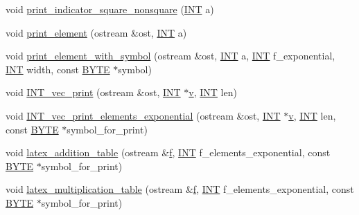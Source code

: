 \begin{DoxyCompactItemize}
\item 
void \mbox{\hyperlink{classfinite__field_a63e6335651a240d50fa79c5d1debbf21}{print\+\_\+indicator\+\_\+square\+\_\+nonsquare}} (\mbox{\hyperlink{galois_8h_a09fddde158a3a20bd2dcadb609de11dc}{I\+NT}} a)
\item 
void \mbox{\hyperlink{classfinite__field_ab7d1f59c043d7696b8b47c92d0fedad5}{print\+\_\+element}} (ostream \&ost, \mbox{\hyperlink{galois_8h_a09fddde158a3a20bd2dcadb609de11dc}{I\+NT}} a)
\item 
void \mbox{\hyperlink{classfinite__field_aa0180c961aa4a0a8934cb4dc82e38a4d}{print\+\_\+element\+\_\+with\+\_\+symbol}} (ostream \&ost, \mbox{\hyperlink{galois_8h_a09fddde158a3a20bd2dcadb609de11dc}{I\+NT}} a, \mbox{\hyperlink{galois_8h_a09fddde158a3a20bd2dcadb609de11dc}{I\+NT}} f\+\_\+exponential, \mbox{\hyperlink{galois_8h_a09fddde158a3a20bd2dcadb609de11dc}{I\+NT}} width, const \mbox{\hyperlink{galois_8h_ab6cc7b4aeb6ea31aba2b3fbfc83ff5e6}{B\+Y\+TE}} $\ast$symbol)
\item 
void \mbox{\hyperlink{classfinite__field_a9c33a61dedc197e37b014b6f8dc07f06}{I\+N\+T\+\_\+vec\+\_\+print}} (ostream \&ost, \mbox{\hyperlink{galois_8h_a09fddde158a3a20bd2dcadb609de11dc}{I\+NT}} $\ast$\mbox{\hyperlink{simeon_8_c_aeb3f3030944801b163bc3b829a7f6710}{v}}, \mbox{\hyperlink{galois_8h_a09fddde158a3a20bd2dcadb609de11dc}{I\+NT}} len)
\item 
void \mbox{\hyperlink{classfinite__field_acbb6173b937e7edb422259f615909405}{I\+N\+T\+\_\+vec\+\_\+print\+\_\+elements\+\_\+exponential}} (ostream \&ost, \mbox{\hyperlink{galois_8h_a09fddde158a3a20bd2dcadb609de11dc}{I\+NT}} $\ast$\mbox{\hyperlink{simeon_8_c_aeb3f3030944801b163bc3b829a7f6710}{v}}, \mbox{\hyperlink{galois_8h_a09fddde158a3a20bd2dcadb609de11dc}{I\+NT}} len, const \mbox{\hyperlink{galois_8h_ab6cc7b4aeb6ea31aba2b3fbfc83ff5e6}{B\+Y\+TE}} $\ast$symbol\+\_\+for\+\_\+print)
\item 
void \mbox{\hyperlink{classfinite__field_a4487b3df0993aeda7451e30d21aa2f57}{latex\+\_\+addition\+\_\+table}} (ostream \&\mbox{\hyperlink{alphabet2_8_c_a362077c979b0bb65159c603270e40f70}{f}}, \mbox{\hyperlink{galois_8h_a09fddde158a3a20bd2dcadb609de11dc}{I\+NT}} f\+\_\+elements\+\_\+exponential, const \mbox{\hyperlink{galois_8h_ab6cc7b4aeb6ea31aba2b3fbfc83ff5e6}{B\+Y\+TE}} $\ast$symbol\+\_\+for\+\_\+print)
\item 
void \mbox{\hyperlink{classfinite__field_a1d35a34d25d5d38a60f67ae7e5dbb4c7}{latex\+\_\+multiplication\+\_\+table}} (ostream \&\mbox{\hyperlink{alphabet2_8_c_a362077c979b0bb65159c603270e40f70}{f}}, \mbox{\hyperlink{galois_8h_a09fddde158a3a20bd2dcadb609de11dc}{I\+NT}} f\+\_\+elements\+\_\+exponential, const \mbox{\hyperlink{galois_8h_ab6cc7b4aeb6ea31aba2b3fbfc83ff5e6}{B\+Y\+TE}} $\ast$symbol\+\_\+for\+\_\+print)

\end{DoxyCompactItemize}
